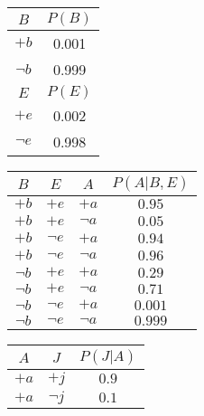 \begin{table}[h]%
    \begin{minipage}{.25\linewidth}
      \centering
        \begin{tabular}{cc}
          \toprule
          $B$ & $P(B)$ \\
          \midrule
          $+b$  & 0.001 \\
          $\neg b$  & 0.999\\
          \bottomrule
          \toprule
          $E$ & $P(E)$ \\
          \midrule
          $+e$  & 0.002 \\
          $\neg e$  & 0.998\\
          \bottomrule
        \end{tabular}
    \end{minipage}%
    \begin{minipage}{.4\linewidth}
      \centering
        \begin{tabular}{cccc}
          \toprule
          $B$ & $E$ & $A$ & $P(A|B,E)$\\
          \midrule
          $+b$     & $+e$     & $+a$     & $0.95$ \\
          $+b$     & $+e$     & $\neg a$ & $0.05$ \\
          $+b$     & $\neg e$ & $+a$     & $0.94$ \\
          $+b$     & $\neg e$ & $\neg a$ & $0.96$ \\
          $\neg b$ & $+e$     & $+a$     & $0.29$ \\
          $\neg b$ & $+e$     & $\neg a$ & $0.71$ \\
          $\neg b$ & $\neg e$ & $+a$     & $0.001$ \\
          $\neg b$ & $\neg e$ & $\neg a$ & $0.999$ \\
          \bottomrule
        \end{tabular}
    \end{minipage}
    \begin{minipage}{.35\linewidth}
      \centering
        \begin{tabular}{ccc}
          \toprule
          $A$ & $J$ & $P(J|A)$ \\
          \midrule
          $+a$     & $+j$     & $0.9$ \\
          $+a$     & $\neg j$ & $0.1$ \\

\end{tabular}
\end{minipage}
\end{table}
